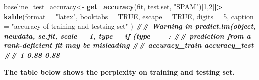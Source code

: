 \documentclass[
]{article}
\newenvironment{Shaded}{\begin{snugshade}}{\end{snugshade}}
\newcommand{\AttributeTok}[1]{\textcolor[rgb]{0.13,0.29,0.53}{#1}}
\newcommand{\ConstantTok}[1]{\textcolor[rgb]{0.56,0.35,0.01}{#1}}
\newcommand{\DecValTok}[1]{\textcolor[rgb]{0.00,0.00,0.81}{#1}}
\newcommand{\DocumentationTok}[1]{\textcolor[rgb]{0.56,0.35,0.01}{\textbf{\textit{#1}}}}
\newcommand{\FunctionTok}[1]{\textcolor[rgb]{0.13,0.29,0.53}{\textbf{#1}}}
\newcommand{\NormalTok}[1]{#1}
\newcommand{\OtherTok}[1]{\textcolor[rgb]{0.56,0.35,0.01}{#1}}
\newcommand{\SpecialCharTok}[1]{\textcolor[rgb]{0.81,0.36,0.00}{\textbf{#1}}}
\newcommand{\StringTok}[1]{\textcolor[rgb]{0.31,0.60,0.02}{#1}}
\begin{document}
\begin{Shaded}
\begin{Highlighting}[]
\NormalTok{baseline\_test\_accuracy}\OtherTok{\textless{}{-}} \FunctionTok{get\_accuracy}\NormalTok{(fit, test.set, }\StringTok{"SPAM"}\NormalTok{)[}\DecValTok{1}\NormalTok{,}\DecValTok{2}\NormalTok{]}\SpecialCharTok{|\textgreater{}} 
  \FunctionTok{kable}\NormalTok{(}\AttributeTok{format =} \StringTok{"latex"}\NormalTok{,}
        \AttributeTok{booktabs =} \ConstantTok{TRUE}\NormalTok{, }
        \AttributeTok{escape =} \ConstantTok{TRUE}\NormalTok{, }
        \AttributeTok{digits =} \DecValTok{5}\NormalTok{,}
        \AttributeTok{caption =} \StringTok{"accuracy of training and testsing set"}
\NormalTok{        ) }
\DocumentationTok{\#\# Warning in predict.lm(object, newdata, se.fit, scale = 1, type = if (type == :}
\DocumentationTok{\#\# prediction from a rank{-}deficient fit may be misleading}
\DocumentationTok{\#\#   accuracy\_train accuracy\_test}
\DocumentationTok{\#\# 1           0.88          0.88}
\end{Highlighting}
\end{Shaded}

\textbf{The table below shows the perplexity on training and testing
set.}
\end{document}

